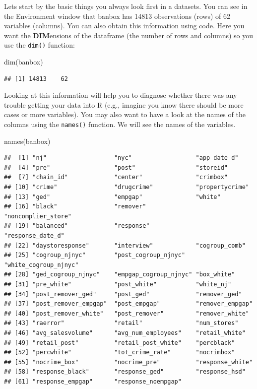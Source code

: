 \documentclass[
]{book}
\newenvironment{Shaded}{\begin{snugshade}}{\end{snugshade}}
\newcommand{\FunctionTok}[1]{\textcolor[rgb]{0.00,0.00,0.00}{#1}}
\newcommand{\NormalTok}[1]{#1}
\begin{document}
Lets start by the basic things you always look first in a datasets. You can see in the Environment window that banbox has 14813 observations (rows) of 62 variables (columns). You can also obtain this information using code. Here you want the \textbf{DIM}ensions of the dataframe (the number of rows and columns) so you use the \texttt{dim()} function:

\begin{Shaded}
\begin{Highlighting}[]
\FunctionTok{dim}\NormalTok{(banbox)}
\end{Highlighting}
\end{Shaded}

\begin{verbatim}
## [1] 14813    62
\end{verbatim}

Looking at this information will help you to diagnose whether there was any trouble getting your data into R (e.g., imagine you know there should be more cases or more variables). You may also want to have a look at the names of the columns using the \texttt{names()} function. We will see the names of the variables.

\begin{Shaded}
\begin{Highlighting}[]
\FunctionTok{names}\NormalTok{(banbox)}
\end{Highlighting}
\end{Shaded}

\begin{verbatim}
##  [1] "nj"                   "nyc"                  "app_date_d"          
##  [4] "pre"                  "post"                 "storeid"             
##  [7] "chain_id"             "center"               "crimbox"             
## [10] "crime"                "drugcrime"            "propertycrime"       
## [13] "ged"                  "empgap"               "white"               
## [16] "black"                "remover"              "noncomplier_store"   
## [19] "balanced"             "response"             "response_date_d"     
## [22] "daystoresponse"       "interview"            "cogroup_comb"        
## [25] "cogroup_njnyc"        "post_cogroup_njnyc"   "white_cogroup_njnyc" 
## [28] "ged_cogroup_njnyc"    "empgap_cogroup_njnyc" "box_white"           
## [31] "pre_white"            "post_white"           "white_nj"            
## [34] "post_remover_ged"     "post_ged"             "remover_ged"         
## [37] "post_remover_empgap"  "post_empgap"          "remover_empgap"      
## [40] "post_remover_white"   "post_remover"         "remover_white"       
## [43] "raerror"              "retail"               "num_stores"          
## [46] "avg_salesvolume"      "avg_num_employees"    "retail_white"        
## [49] "retail_post"          "retail_post_white"    "percblack"           
## [52] "percwhite"            "tot_crime_rate"       "nocrimbox"           
## [55] "nocrime_box"          "nocrime_pre"          "response_white"      
## [58] "response_black"       "response_ged"         "response_hsd"        
## [61] "response_empgap"      "response_noempgap"
\end{verbatim}
\end{document}
